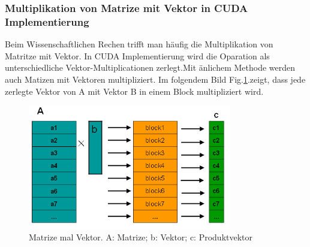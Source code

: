 \subsubsection{Multiplikation von Matrize mit Vektor in CUDA Implementierung}

Beim Wissenschaftlichen Rechen trifft man häufig die Multiplikation von Matritze mit Vektor. In CUDA Implementierung wird die Oparation als unterschiedliche Vektor-Multiplicationen zerlegt.Mit änlichem Methode werden auch Matizen mit Vektoren multipliziert. Im folgendem Bild Fig.\ref{MatrixVektor}.zeigt, dass jede zerlegte Vektor von A mit Vektor B in einem Block multipliziert wird.

\begin{figure}[htbp]
\includegraphics[width=3.5in]{../xby/pic//MatrixVektor}
\caption{Matrize mal Vektor. A: Matrize; b: Vektor; c: Produktvektor}
\label{MatrixVektor}
\end{figure}